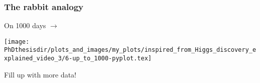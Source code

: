 
\begin{frame}
\frametitle{The rabbit analogy}
\addtocounter{framenumber}{-1}
\transwipe[direction=90]
\begin{center}
\begin{minipage}[c]{.29\textwidth}
On \num{1000} days $\rightarrow$
\end{minipage}
\begin{minipage}[c]{.4\textwidth}
\vspace{-\baselineskip}
\texttt{[image: \\PhDthesisdir/plots\_and\_images/my\_plots/inspired\_from\_Higgs\_discovery\_explained\_video\_3/6-up\_to\_1000-pyplot.tex]}
\end{minipage}
\begin{minipage}[c]{.29\textwidth}
Fill up with more data!
\end{minipage}
\end{center}
\end{frame}


